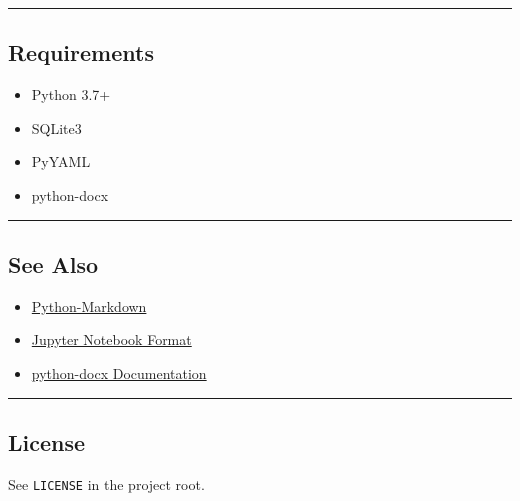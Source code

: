 \begin{Shaded}
\begin{Highlighting}[]
\NormalTok{)}
\end{Highlighting}
\end{Shaded}

\begin{center}\rule{0.5\linewidth}{0.5pt}\end{center}

\subsection{Requirements}\label{requirements}

\begin{itemize}
\tightlist
\item
  Python 3.7+
\item
  SQLite3
\item
  PyYAML
\item
  python-docx
\end{itemize}

\begin{center}\rule{0.5\linewidth}{0.5pt}\end{center}

\subsection{See Also}\label{see-also}

\begin{itemize}
\tightlist
\item
  \href{https://python-markdown.github.io/}{Python-Markdown}
\item
  \href{https://nbformat.readthedocs.io/en/latest/}{Jupyter Notebook
  Format}
\item
  \href{https://python-docx.readthedocs.io/en/latest/}{python-docx
  Documentation}
\end{itemize}

\begin{center}\rule{0.5\linewidth}{0.5pt}\end{center}

\subsection{License}\label{license}

See \texttt{LICENSE} in the project root.
